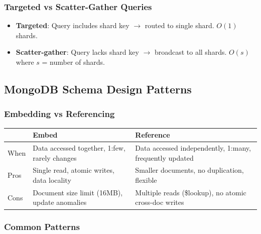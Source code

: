 \documentclass[12pt,a4paper]{article}
\begin{document}
\subsubsection{Targeted vs Scatter-Gather Queries}

\begin{itemize}
    \item \textbf{Targeted}: Query includes shard key $\rightarrow$ routed to single shard. $O(1)$ shards.
    \item \textbf{Scatter-gather}: Query lacks shard key $\rightarrow$ broadcast to all shards. $O(s)$ where $s$ = number of shards.
\end{itemize}

\subsection{MongoDB Schema Design Patterns}

\subsubsection{Embedding vs Referencing}

\begin{center}
\begin{tabular}{lp{5cm}p{5cm}}
\toprule
& \textbf{Embed} & \textbf{Reference} \\
\midrule
When & Data accessed together, 1:few, rarely changes & Data accessed independently, 1:many, frequently updated \\
Pros & Single read, atomic writes, data locality & Smaller documents, no duplication, flexible \\
Cons & Document size limit (16MB), update anomalies & Multiple reads (\$lookup), no atomic cross-doc writes \\
\bottomrule
\end{tabular}
\end{center}

\subsubsection{Common Patterns}
\end{document}
